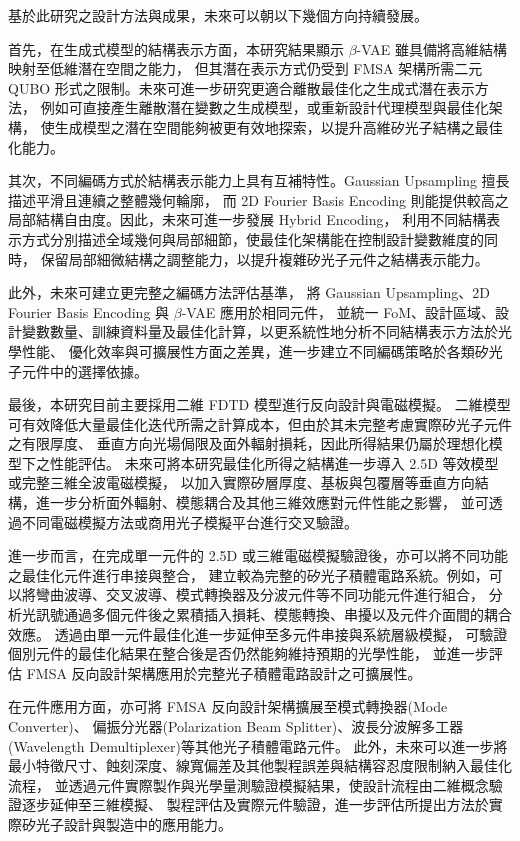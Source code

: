基於此研究之設計方法與成果，未來可以朝以下幾個方向持續發展。

首先，在生成式模型的結構表示方面，本研究結果顯示 $\beta$-VAE 雖具備將高維結構映射至低維潛在空間之能力，
但其潛在表示方式仍受到 FMSA 架構所需二元 QUBO 形式之限制。未來可進一步研究更適合離散最佳化之生成式潛在表示方法，
例如可直接產生離散潛在變數之生成模型，或重新設計代理模型與最佳化架構，
使生成模型之潛在空間能夠被更有效地探索，以提升高維矽光子結構之最佳化能力。

其次，不同編碼方式於結構表示能力上具有互補特性。Gaussian Upsampling 擅長描述平滑且連續之整體幾何輪廓，
而 2D Fourier Basis Encoding 則能提供較高之局部結構自由度。因此，未來可進一步發展 Hybrid Encoding，
利用不同結構表示方式分別描述全域幾何與局部細節，使最佳化架構能在控制設計變數維度的同時，
保留局部細微結構之調整能力，以提升複雜矽光子元件之結構表示能力。

此外，未來可建立更完整之編碼方法評估基準，
將 Gaussian Upsampling、2D Fourier Basis Encoding 與 $\beta$-VAE 應用於相同元件，
並統一 FoM、設計區域、設計變數數量、訓練資料量及最佳化計算，以更系統性地分析不同結構表示方法於光學性能、
優化效率與可擴展性方面之差異，進一步建立不同編碼策略於各類矽光子元件中的選擇依據。

最後，本研究目前主要採用二維 FDTD 模型進行反向設計與電磁模擬。
二維模型可有效降低大量最佳化迭代所需之計算成本，但由於其未完整考慮實際矽光子元件之有限厚度、
垂直方向光場侷限及面外輻射損耗，因此所得結果仍屬於理想化模型下之性能評估。
未來可將本研究最佳化所得之結構進一步導入 2.5D 等效模型或完整三維全波電磁模擬，
以加入實際矽層厚度、基板與包覆層等垂直方向結構，進一步分析面外輻射、模態耦合及其他三維效應對元件性能之影響，
並可透過不同電磁模擬方法或商用光子模擬平台進行交叉驗證。

進一步而言，在完成單一元件的 2.5D 或三維電磁模擬驗證後，亦可以將不同功能之最佳化元件進行串接與整合，
建立較為完整的矽光子積體電路系統。例如，可以將彎曲波導、交叉波導、模式轉換器及分波元件等不同功能元件進行組合，
分析光訊號通過多個元件後之累積插入損耗、模態轉換、串擾以及元件介面間的耦合效應。
透過由單一元件最佳化進一步延伸至多元件串接與系統層級模擬，
可驗證個別元件的最佳化結果在整合後是否仍然能夠維持預期的光學性能，
並進一步評估 FMSA 反向設計架構應用於完整光子積體電路設計之可擴展性。

在元件應用方面，亦可將 FMSA 反向設計架構擴展至模式轉換器(Mode Converter)、
偏振分光器(Polarization Beam Splitter)、波長分波解多工器(Wavelength Demultiplexer)等其他光子積體電路元件。
此外，未來可以進一步將最小特徵尺寸、蝕刻深度、線寬偏差及其他製程誤差與結構容忍度限制納入最佳化流程，
並透過元件實際製作與光學量測驗證模擬結果，使設計流程由二維概念驗證逐步延伸至三維模擬、
製程評估及實際元件驗證，進一步評估所提出方法於實際矽光子設計與製造中的應用能力。
